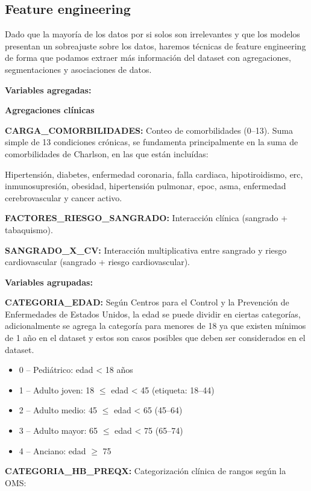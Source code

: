 \documentclass[12pt, letterpaper]{article}
\begin{document}
\subsection{Feature engineering}

Dado que la mayoría de los datos por si solos son irrelevantes y que los modelos presentan un sobreajuste sobre los datos, haremos técnicas de feature engineering de forma que podamos extraer más información del dataset con agregaciones, segmentaciones y asociaciones de datos.

\textbf{Variables agregadas:}

\textbf{Agregaciones clínicas}

\textbf{CARGA\_COMORBILIDADES:} Conteo de comorbilidades (0--13). Suma simple de 13 condiciones crónicas, se fundamenta principalmente en la suma de comorbilidades de Charlson, en las que están incluídas:

Hipertensión, diabetes, enfermedad coronaria, falla cardiaca, hipotiroidismo, erc, inmunosupresión, obesidad, hipertensión pulmonar, epoc, asma, enfermedad cerebrovascular y cancer activo.

\textbf{FACTORES\_RIESGO\_SANGRADO:} Interacción clínica (sangrado + tabaquismo).

\textbf{SANGRADO\_X\_CV:} Interacción multiplicativa entre sangrado y riesgo cardiovascular (sangrado + riesgo cardiovascular).

\textbf{Variables agrupadas:}

\textbf{CATEGORIA\_EDAD:} Según Centros para el Control y la Prevención de Enfermedades de Estados Unidos, la edad se puede dividir en ciertas categorías, adicionalmente se agrega la categoría para menores de 18 ya que existen mínimos de 1 año en el dataset y estos son casos posibles que deben ser considerados en el dataset.

\begin{itemize}
    \item 0 -- Pediátrico: edad < 18 años
    \item 1 -- Adulto joven: 18 $\leq$ edad < 45 (etiqueta: 18--44)
    \item 2 -- Adulto medio: 45 $\leq$ edad < 65 (45--64)
    \item 3 -- Adulto mayor: 65 $\leq$ edad < 75 (65--74)
    \item 4 -- Anciano: edad $\geq$ 75
\end{itemize}

\textbf{CATEGORIA\_HB\_PREQX:} Categorización clínica de rangos según la OMS:
\end{document}

